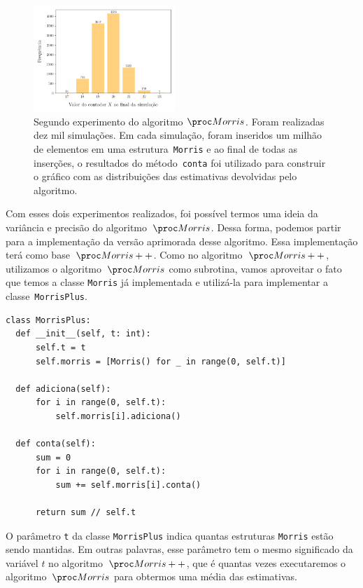 \begin{figure}[h]
  \centering
  \includegraphics[height=4cm, width=.5\textwidth]{figuras/morris_variance.png}
	\caption{Segundo experimento do algoritmo $\Morris$. Foram realizadas dez mil simulações. Em cada simulação, foram 
  inseridos um milhão de elementos em uma estrutura~\texttt{Morris} e ao final de todas as inserções, o resultados do 
  método~\texttt{conta} foi utilizado para construir o gráfico com as distribuições das estimativas devolvidas pelo 
  algoritmo.}
  \label{fig:morris:variance}
\end{figure}

Com esses dois experimentos realizados, foi possível termos uma ideia da variância e precisão do algoritmo~$\Morris$. 
Dessa forma, podemos partir para a implementação da versão aprimorada desse algoritmo. Essa implementação terá como 
base~$\Morrispp$. Como no algoritmo~$\Morrispp$, utilizamos o algoritmo~$\Morris$ como subrotina, vamos aproveitar o 
fato que temos a classe \texttt{Morris} já implementada e utilizá-la para implementar a classe~\texttt{MorrisPlus}.

\newpage
\begin{lstlisting}[style=mypython,caption=Implementação do algoritmo $\Morrispp$,captionpos=b, label=morris:plus:code]
class MorrisPlus:
  def __init__(self, t: int):
      self.t = t
      self.morris = [Morris() for _ in range(0, self.t)]

  def adiciona(self):
      for i in range(0, self.t):
          self.morris[i].adiciona()

  def conta(self):
      sum = 0
      for i in range(0, self.t):
          sum += self.morris[i].conta()

      return sum // self.t
\end{lstlisting}

O parâmetro \texttt{t} da classe \texttt{MorrisPlus} indica quantas estruturas \texttt{Morris} estão sendo mantidas. Em 
outras palavras, esse parâmetro tem o mesmo significado da variável $t$ no algoritmo~$\Morrispp$, que é quantas vezes 
executaremos o algoritmo~$\Morris$ para obtermos uma média das estimativas.


